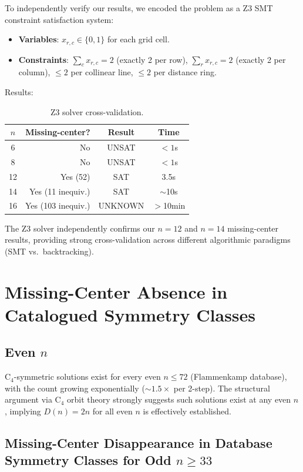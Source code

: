 \documentclass[11pt,a4paper]{article}
\theoremstyle{plain}
\theoremstyle{definition}
\begin{document}
To independently verify our results, we encoded the problem as a Z3 SMT constraint satisfaction system:

\begin{itemize}[nosep]
\item \textbf{Variables}: $x_{r,c}\in\{0,1\}$ for each grid cell.
\item \textbf{Constraints}: $\sum_c x_{r,c}=2$ (exactly 2 per row), $\sum_r x_{r,c}=2$ (exactly 2 per column), $\le2$ per collinear line, $\le2$ per distance ring.
\end{itemize}

Results:
\begin{table}[H]
\centering
\caption{Z3 solver cross-validation.}
\label{tab:z3}
\begin{tabular}{crcc}
\toprule
$n$ & Missing-center? & Result & Time \\
\midrule
6 & No & UNSAT & $<1$s \\
8 & No & UNSAT & $<1$s \\
12 & Yes (52) & SAT & 3.5s \\
14 & Yes (11 inequiv.) & SAT & $\sim$10s \\
16 & Yes (103 inequiv.) & UNKNOWN & $>$10min \\
\bottomrule
\end{tabular}
\end{table}

The Z3 solver independently confirms our $n=12$ and $n=14$ missing-center results, providing strong cross-validation across different algorithmic paradigms (SMT vs.\ backtracking).

\section{Missing-Center Absence in Catalogued Symmetry Classes}
\label{sec:extinction}

\subsection{Even $n$}

C$_4$-symmetric solutions exist for every even $n\le 72$ (Flammenkamp database), with the count growing exponentially ($\sim1.5\times$ per 2-step). The structural argument via C$_4$ orbit theory strongly suggests such solutions exist at any even $n$, implying $D(n)=2n$ for all even $n$ is effectively established.

\subsection{Missing-Center Disappearance in Database Symmetry Classes for Odd $n\ge 33$}
\end{document}

